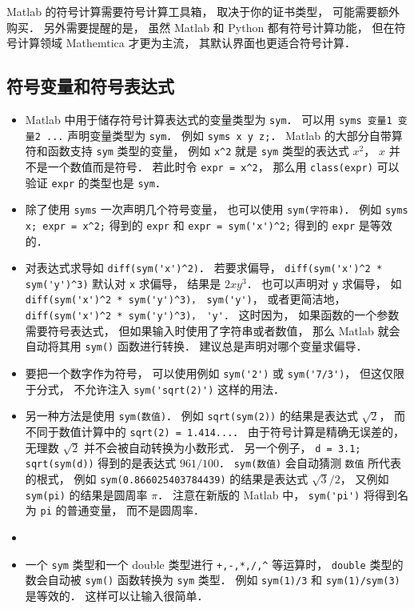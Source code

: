 

Matlab 的符号计算需要符号计算工具箱， 取决于你的证书类型， 可能需要额外购买． 另外需要提醒的是， 虽然 Matlab 和 Python 都有符号计算功能， 但在符号计算领域 Mathemtica 才更为主流， 其默认界面也更适合符号计算．

\subsection{符号变量和符号表达式}
\begin{itemize}
\item Matlab 中用于储存符号计算表达式的变量类型为 \verb|sym|． 可以用 \verb|syms 变量1 变量2 ...| 声明变量类型为 \verb|sym|． 例如 \verb|syms x y z;|． Matlab 的大部分自带算符和函数支持 \verb|sym| 类型的变量， 例如 \verb|x^2| 就是 \verb|sym| 类型的表达式 $x^2$， $x$ 并不是一个数值而是符号． 若此时令 \verb|expr = x^2|， 那么用 \verb|class(expr)| 可以验证 \verb|expr| 的类型也是 \verb|sym|．

\item 除了使用 \verb|syms| 一次声明几个符号变量， 也可以使用 \verb|sym(字符串)|． 例如 \verb|syms x; expr = x^2;| 得到的 \verb|expr| 和 \verb|expr = sym('x')^2;| 得到的 \verb|expr| 是等效的．

\item  对表达式求导如 \verb|diff(sym('x')^2)|． 若要求偏导， \verb|diff(sym('x')^2 * sym('y')^3)| 默认对 \verb|x| 求偏导， 结果是 $2x y^3$． 也可以声明对 \verb|y| 求偏导， 如 \verb|diff(sym('x')^2 * sym('y')^3)， sym('y')|， 或者更简洁地， \verb|diff(sym('x')^2 * sym('y')^3)， 'y'|． 这时因为， 如果函数的一个参数需要符号表达式， 但如果输入时使用了字符串或者数值， 那么 Matlab 就会自动将其用 \verb|sym()| 函数进行转换． 建议总是声明对哪个变量求偏导．

\item  要把一个数字作为符号， 可以使用例如 \verb|sym('2')| 或 \verb|sym('7/3')|， 但这仅限于分式， 不允许注入 \verb|sym('sqrt(2)')| 这样的用法．

\item 另一种方法是使用 \verb|sym(数值)|． 例如 \verb|sqrt(sym(2))| 的结果是表达式 $\sqrt 2$， 而不同于数值计算中的 \verb|sqrt(2) = 1.414...|． 由于符号计算是精确无误差的， 无理数 $\sqrt{2}$ 并不会被自动转换为小数形式． 另一个例子， \verb|d = 3.1; sqrt(sym(d))| 得到的是表达式 $961/100$． \verb|sym(数值)| 会自动猜测 \verb|数值| 所代表的根式， 例如 \verb|sym(0.866025403784439)| 的结果是表达式 $\sqrt{3}/2$， 又例如 \verb|sym(pi)| 的结果是圆周率 $\pi$． 注意在新版的 Matlab 中， \verb|sym('pi')| 将得到名为 \verb|pi| 的普通变量， 而不是圆周率．

\item \item 一个 \verb|sym| 类型和一个 double 类型进行 \verb|+,-,*,/,^| 等运算时， \verb|double| 类型的数会自动被 \verb|sym()| 函数转换为 \verb|sym| 类型． 例如 \verb|sym(1)/3| 和 \verb|sym(1)/sym(3)| 是等效的． 这样可以让输入很简单．
\end{itemize}

